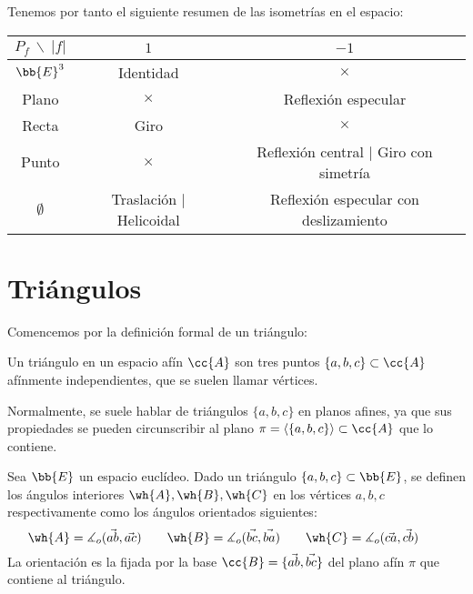 Tenemos por tanto el siguiente resumen de las isometrías en el espacio:
\begin{table}[H]
    \centering
    \begin{tabular}{c||c|c}
        $P_f~ \backslash~|f|$ & $1$ & $-1$  \\ \hline \hline
        $\bb{E}^3$ & Identidad & $\times$ \\
        Plano & $\times$ & Reflexión especular \\
        Recta & Giro & $\times$ \\
        Punto & $\times$ & Reflexión central $\mid$ Giro con simetría \\
        $\emptyset$ & Traslación $\mid$ Helicoidal & Reflexión especular con deslizamiento
    \end{tabular}
\end{table}


\section{Triángulos}

Comencemos por la definición formal de un triángulo:
\begin{definicion}[Triángulo]
    Un triángulo en un espacio afín $\cc{A}$ son tres puntos $\{a,b,c\}\subset \cc{A}$ afínmente independientes, que se suelen llamar vértices.
\end{definicion}
Normalmente, se suele hablar de triángulos $\{a, b, c\}$ en planos afines, ya que sus propiedades se pueden circunscribir al plano $\pi = \langle\{a, b, c\}\rangle\subset \cc{A}$ que lo contiene.

\begin{definicion}
    Sea $\bb{E}$ un espacio euclídeo. Dado un triángulo $\{a,b,c\}\subset \bb{E}$, se definen los ángulos interiores $\wh{A}, \wh{B}, \wh{C}$ en los vértices $a,b,c$ respectivamente como los ángulos orientados siguientes:
    \begin{equation*}
        \wh{A} = \measuredangle_o (\vec{ab}, \vec{ac}) \qquad
        \wh{B} = \measuredangle_o (\vec{bc}, \vec{ba}) \qquad
        \wh{C} = \measuredangle_o (\vec{ca}, \vec{cb}) \qquad
    \end{equation*}
    La orientación es la fijada por la base $\cc{B}=\{\vec{ab}, \vec{bc}\}$ del plano afín $\pi$ que contiene al triángulo.
\end{definicion}

